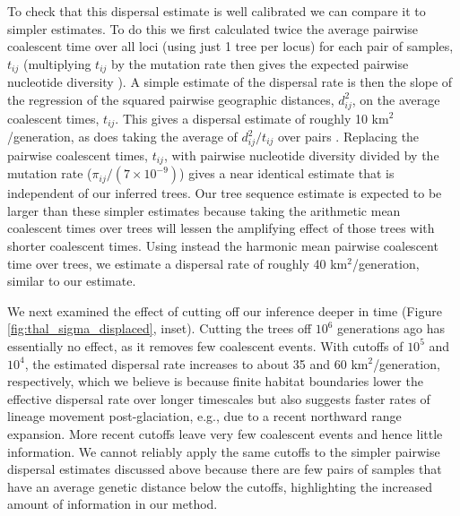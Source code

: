 \documentclass[12pt]{article}
\begin{document}
To check that this dispersal estimate is well calibrated we can compare it to simpler estimates. To do this we first calculated twice the average pairwise coalescent time over all loci (using just 1 tree per locus) for each pair of samples, $t_{ij}$ (multiplying $t_{ij}$ by the mutation rate then gives the expected pairwise nucleotide diversity \citep{ralph2020efficiently}). A simple estimate of the dispersal rate is then the slope of the regression of the squared pairwise geographic distances, $d_{ij}^2$, on the average coalescent times, $t_{ij}$. This gives a dispersal estimate of roughly 10 km$^2$/generation, as does taking the average of $d_{ij}^2/t_{ij}$ over pairs \citep{ianni2023exploring}. Replacing the pairwise coalescent times, $t_{ij}$, with pairwise nucleotide diversity divided by the mutation rate ($\pi_{ij}/(7\times10^{-9})$) gives a near identical estimate that is independent of our inferred trees. Our tree sequence estimate is expected to be larger than these simpler estimates because taking the arithmetic mean coalescent times over trees will lessen the amplifying effect of those trees with shorter coalescent times. Using instead the harmonic mean pairwise coalescent time over trees, we estimate a dispersal rate of roughly 40 km$^2$/generation, similar to our estimate. 

We next examined the effect of cutting off our inference deeper in time (Figure \ref{fig:thal_sigma_displaced}, inset). Cutting the trees off $10^6$ generations ago has essentially no effect, as it removes few coalescent events. With cutoffs of $10^5$ and $10^4$, the estimated dispersal rate increases to about 35 and 60 km$^2$/generation, respectively, which we believe is because finite habitat boundaries lower the effective dispersal rate over longer timescales but also suggests faster rates of lineage movement post-glaciation, e.g., due to a recent northward range expansion. More recent cutoffs leave very few coalescent events and hence little information. We cannot reliably apply the same cutoffs to the simpler pairwise dispersal estimates discussed above because there are few pairs of samples that have an average genetic distance below the cutoffs, highlighting the increased amount of information in our method.
\end{document}
